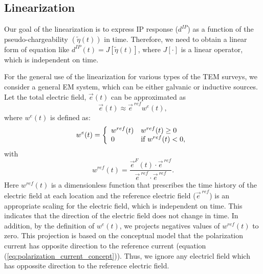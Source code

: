 \documentclass[a4paper, 11pt]{article}
\newcommand {\e}  { {\vec e} }
\newcommand{\peta}{\tilde{\eta}}
\newcommand{\eref}{\e^{\ ref}}
\newcommand{\dip}{d^{IP}}
\begin{document}

\subsection{Linearization}
Our goal of the linearization is to express IP response ($\dip$) as a function of the pseudo-chargeability $(\peta(t))$ in time. 
Therefore, we need to obtain a linear form of equation like $\dip(t) = J[\peta(t)]$, where $J[\cdot]$ is a linear operator, which is independent on time. 

For the general use of the linearization for various types of the TEM surveys, we consider a general EM system, which can be either galvanic or inductive sources. 
Let the total electric field, $\e(t)$ can be approximated as
\begin{equation}
  \e(t) \approx \eref w^e(t),
  \label{eq: e_with_eref}
\end{equation}
where $w^e(t)$ is defined as:
\begin{equation}
  w^e(t) = \left\{ 
  \begin{array}{l l}
    w^{ref}(t) & w^{ref}(t) \ge 0 \\
    0 & \text{if } w^{ref}(t) < 0, 
  \end{array}\right.
  \label{eq: we}
\end{equation}
with
\begin{equation}
  w^{ref}(t) = \frac{\e^F(t)\cdot\eref}{\eref\cdot\eref}.
\end{equation}
Here $w^{ref}(t)$ is a dimensionless function that prescribes the time history of the electric field at each location and the reference electric field ($\eref$) is an appropriate scaling for the electric field, which is independent on time. 
This indicates that the direction of the electric field does not change in time. 
In addition, by the definition of $w^e(t)$, we projects negatives values of  $w^{ref}(t)$ to zero.
This projection is based on the conceptual model that the polarization current has opposite direction to the reference current (equation (\ref{eq:polarization_current_concept})). Thus, we ignore any electricl field which has oppossite direction to the reference electric field. 
\end{document}
